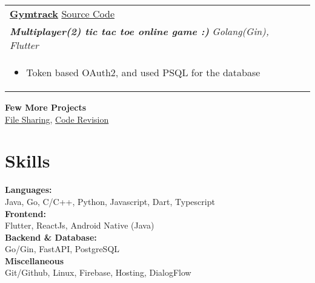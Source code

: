 \documentclass[a4paper,8pt]{article}
\begin{document}
\begin{tabularx}{\linewidth}{ @{}l r@{} }
\color[HTML]{1C033C} \textbf{\uline{Gymtrack}} \hfill \color[HTML]{371e77} {\href{https://github.com/bhaskaraa45/gymtrack}{Source Code}}  \\[4pt] \color[HTML]{371e77} \textbf{\textit{Multiplayer(2) tic tac toe online game :)}} \hfill \color[HTML]{4B28A4} \textit{Golang(Gin), Flutter} \\[5pt]
\begin{minipage}[t]{\linewidth}
    \begin{itemize}[nosep,after=\strut, leftmargin=2em, itemsep=2pt]
        \item Token based OAuth2, and used PSQL for the database
    \end{itemize}
    \end{minipage}
\end{tabularx}

\color[HTML]{1C033C}\textbf{Few More Projects} \\[2pt]
\color[HTML]{371e77} \hspace*{4ex} {\href{https://github.com/bhaskaraa45/filesharing}{File Sharing}}, {\href{https://github.com/bhaskaraa45/CodeRevision-android-app}{Code Revision}}\\[12pt]


\section{Skills}
\color[HTML]{1C033C}\textbf{Languages:} \\[2pt]
\color[HTML]{371e77} \hspace*{4ex} Java, Go, C/C++, Python, Javascript, Dart, Typescript\\[3pt]
\color[HTML]{1C033C}\textbf{Frontend:} \\[2pt]
\color[HTML]{371e77} \hspace*{4ex} Flutter, ReactJs, Android Native (Java)\\[3pt]
\color[HTML]{1C033C}\textbf{Backend \& Database:} \\[2pt]
\color[HTML]{371e77} \hspace*{4ex} Go/Gin, FastAPI, PostgreSQL\\[3pt]
\color[HTML]{1C033C}\textbf{Miscellaneous} \\[2pt]
\color[HTML]{371e77} \hspace*{4ex} Git/Github, Linux, Firebase, Hosting, DialogFlow \\[3pt]
\end{document}
